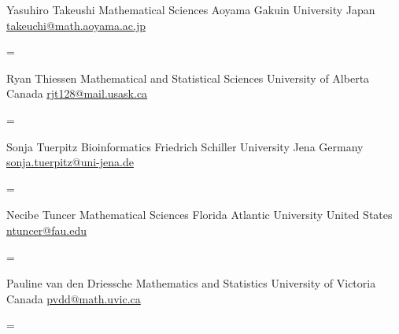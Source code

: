 \documentclass[
  letterpaper,
  DIV=11,
  numbers=noendperiod]{scrartcl}
\newenvironment{absolutelynopagebreak}
  {\par\nobreak\vfil\penalty0\vfilneg
   \vtop\bgroup}
  {\par\xdef\tpd{\the\prevdepth}\egroup
   \prevdepth=\tpd}
\begin{document}
\begin{absolutelynopagebreak}Yasuhiro   Takeushi \newline
\mbox{}\quad  Mathematical Sciences \newline
\mbox{}\quad  Aoyama Gakuin University \newline
\mbox{}\quad  Japan \newline
\mbox{}\quad \href{mailto: takeuchi@math.aoyama.ac.jp }{ takeuchi@math.aoyama.ac.jp }
\end{absolutelynopagebreak}\vskip0.2cm
\begin{absolutelynopagebreak}Ryan   Thiessen \newline
\mbox{}\quad  Mathematical and Statistical Sciences \newline
\mbox{}\quad  University of Alberta \newline
\mbox{}\quad  Canada \newline
\mbox{}\quad \href{mailto: rjt128@mail.usask.ca }{ rjt128@mail.usask.ca }
\end{absolutelynopagebreak}\vskip0.2cm
\begin{absolutelynopagebreak}Sonja   Tuerpitz \newline
\mbox{}\quad  Bioinformatics \newline
\mbox{}\quad  Friedrich Schiller University Jena \newline
\mbox{}\quad  Germany \newline
\mbox{}\quad \href{mailto: sonja.tuerpitz@uni-jena.de }{ sonja.tuerpitz@uni-jena.de }
\end{absolutelynopagebreak}\vskip0.2cm
\begin{absolutelynopagebreak}Necibe    Tuncer \newline
\mbox{}\quad  Mathematical Sciences \newline
\mbox{}\quad  Florida Atlantic University \newline
\mbox{}\quad  United States \newline
\mbox{}\quad \href{mailto: ntuncer@fau.edu }{ ntuncer@fau.edu }
\end{absolutelynopagebreak}\vskip0.2cm
\begin{absolutelynopagebreak}Pauline   van den Driessche \newline
\mbox{}\quad  Mathematics and Statistics \newline
\mbox{}\quad  University of Victoria \newline
\mbox{}\quad  Canada \newline
\mbox{}\quad \href{mailto: pvdd@math.uvic.ca }{ pvdd@math.uvic.ca }
\end{absolutelynopagebreak}\vskip0.2cm
\end{document}
